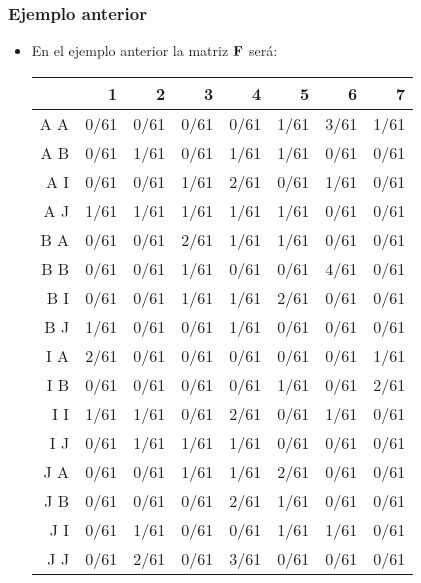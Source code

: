 \begin{frame}
\frametitle{Ejemplo anterior}
\begin{itemize}
\item<2->{En el ejemplo anterior la matriz $\mathbf{F}$ será:
{\tiny\begin{table}[ht]
\begin{center}
\begin{tabular}{rrrrrrrr}
  \hline
 & 1 & 2 & 3 & 4 & 5 & 6 & 7 \\
\hline
A A&   0/61 &   0/61  &   0/61  &   0/61  &   1/61  &   3/61  &   1/61  \\
A B&   0/61  &   1/61  &   0/61  &   1/61  &   1/61  &   0/61  &   0/61  \\
A I&   0/61  &   0/61  &   1/61  &   2/61  &   0/61  &   1/61  &   0/61  \\
A J&   1/61  &   1/61  &   1/61  &   1/61  &   1/61  &   0/61  &   0/61  \\
B A&   0/61  &   0/61  &   2/61  &   1/61  &   1/61  &   0/61  &   0/61  \\
B B&   0/61  &   0/61  &   1/61  &   0/61  &   0/61  &   4/61  &   0/61  \\
B I&   0/61  &   0/61  &   1/61  &   1/61  &   2/61  &   0/61  &   0/61  \\
B J&   1/61  &   0/61  &   0/61  &   1/61  &   0/61  &   0/61  &   0/61  \\
I A&   2/61  &   0/61  &   0/61  &   0/61  &   0/61  &   0/61  &   1/61  \\
I B&   0/61  &   0/61  &   0/61  &   0/61  &   1/61  &   0/61  &   2/61  \\
I I&   1/61  &   1/61  &   0/61  &   2/61  &   0/61  &   1/61  &   0/61  \\
I J&   0/61  &   1/61  &   1/61  &   1/61  &   0/61  &   0/61  &   0/61  \\
J A&   0/61  &   0/61  &   1/61  &   1/61  &   2/61  &   0/61  &   0/61  \\
J B&   0/61  &   0/61  &   0/61  &   2/61  &   1/61  &   0/61  &   0/61  \\
J I&   0/61  &   1/61  &   0/61  &   0/61  &   1/61  &   1/61  &   0/61  \\
J J&   0/61  &   2/61  &   0/61  &   3/61  &   0/61  &   0/61  &   0/61  \\
   \hline
\end{tabular}
\end{center}
\end{table}
}
}
\end{itemize}
\end{frame}

